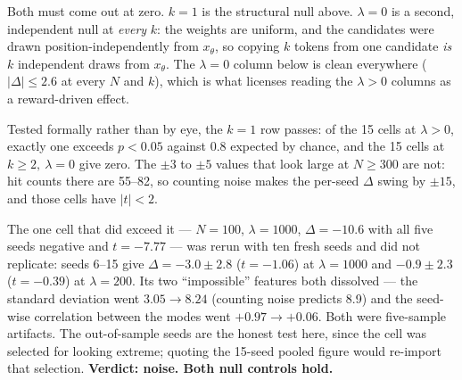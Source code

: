 \documentclass[11pt]{article}
\begin{document}
Both must come out at zero. $k=1$ is the structural null above.
$\lambda=0$ is a second, independent null at \emph{every} $k$: the weights are
uniform, and the candidates were drawn position-independently from
$x_\theta$, so copying $k$ tokens from one candidate \emph{is} $k$ independent
draws from $x_\theta$. The $\lambda=0$ column below is clean everywhere
($|\Delta|\le 2.6$ at every $N$ and $k$), which is what licenses reading the
$\lambda>0$ columns as a reward-driven effect.

Tested formally rather than by eye, the $k=1$ row passes: of the 15 cells
at $\lambda>0$, exactly one exceeds $p<0.05$ against 0.8 expected by chance, and
the 15 cells at $k\ge2,\ \lambda=0$ give zero. The $\pm3$ to $\pm5$ values that
look large at $N\ge300$ are not: hit counts there are 55--82, so counting noise
makes the per-seed $\Delta$ swing by $\pm15$, and those cells have $|t|<2$.

The one cell that did exceed it --- $N=100$, $\lambda=1000$, $\Delta=-10.6$ with
all five seeds negative and $t=-7.77$ --- was rerun with ten fresh seeds and did
not replicate: seeds 6--15 give $\Delta=-3.0\pm2.8$ ($t=-1.06$) at
$\lambda=1000$ and $-0.9\pm2.3$ ($t=-0.39$) at $\lambda=200$. Its two
``impossible'' features both dissolved --- the standard deviation went
$3.05\to8.24$ (counting noise predicts 8.9) and the seed-wise correlation
between the modes went $+0.97\to+0.06$. Both were five-sample artifacts. The
out-of-sample seeds are the honest test here, since the cell was selected for
looking extreme; quoting the 15-seed pooled figure would re-import that
selection. \textbf{Verdict: noise. Both null controls hold.}
\end{document}
